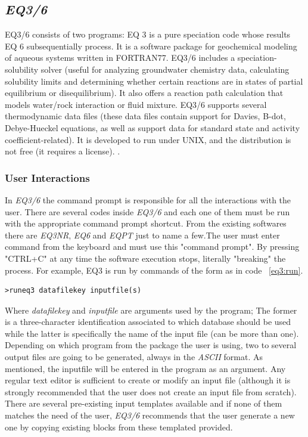 \documentclass[ppgc,mestrado,english]{iiufrgs}
\begin{document}
\subsection{\emph{EQ3/6}}
EQ3/6 consists of two programs: EQ 3 is a pure speciation code whose results EQ 6 subsequentially process. It is a software package for geochemical modeling of aqueous systems written in FORTRAN77. EQ3/6 includes a speciation-solubility solver (useful for analyzing groundwater chemistry data, calculating solubility limits and determining whether certain reactions are in states of partial equilibrium or disequilibrium). It also offers a reaction path calculation that models water/rock interaction or fluid mixture. EQ3/6 supports several thermodynamic data files (these data files contain support for Davies, B-dot, Debye-Hueckel equations, as well as support data for standard state and activity coefficient-related). It is developed to run under UNIX, and the distribution is not free (it requires a license). \cite{Wolery:79} \cite{Wolery:90} \cite{Wolery:92}.

\subsubsection{User Interactions}
In \emph{EQ3/6} the command prompt is responsible for all the interactions with the user. There are several codes inside \emph{EQ3/6} and each one of them must be run with the appropriate command prompt shortcut. From the existing softwares there are \emph{EQ3NR}, \emph{EQ6} and \emph{EQPT} just to name a few.The user must enter command from the keyboard and must use this "command prompt". By pressing "CTRL+C" at any time the software execution stops, literally "breaking" the process. For example, EQ3 is run by commands of the form as in code ~\ref{eq3:run}.

\begin{lstlisting}[frame=single, caption=Running EQ3 in \emph{EQ3/6} package, label=eq3:run]
>runeq3 datafilekey inputfile(s)
\end{lstlisting}

Where \emph{datafilekey} and \emph{inputfile} are arguments used by the program; The former is a three-character identification associated to which database should be used while the latter is specifically the name of the input file (can be more than one). Depending on which program from the package the user is using, two to several output files are going to be generated, always in the \emph{ASCII} format. 
As mentioned, the inputfile will be entered in the program as an argument. Any regular text editor is sufficient to create or modify an input file (although it is strongly recommended that the user does not create an input file from scratch). There are several pre-existing input templates available and if none of them matches the need of the user, \emph{EQ3/6} recommends that the user generate a new one by copying existing blocks from these templated provided.
\end{document}
